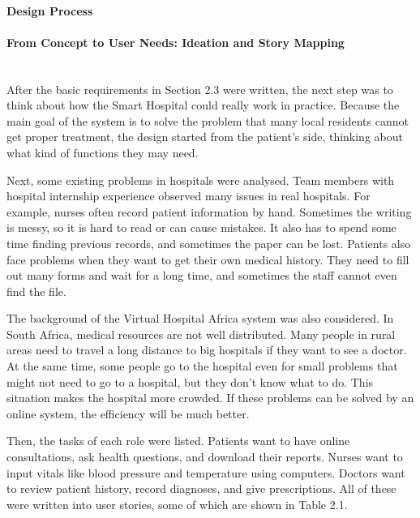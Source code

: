 %
%

\paragraph{Design Process}\mbox{}
\paragraph{From Concept to User Needs: Ideation and Story Mapping}\mbox{}\\
After the basic requirements in Section 2.3 were written, the next step was to think about how the Smart Hospital could really work in practice. Because the main goal of the system is to solve the problem that many local residents cannot get proper treatment, the design started from the patient’s side, thinking about what kind of functions they may need.  

Next, some existing problems in hospitals were analysed. Team members with hospital internship experience observed many issues in real hospitals. For example, nurses often record patient information by hand. Sometimes the writing is messy, so it is hard to read or can cause mistakes. It also has to spend some time finding previous records, and sometimes the paper can be lost. Patients also face problems when they want to get their own medical history. They need to fill out many forms and wait for a long time, and sometimes the staff cannot even find the file.  

The background of the Virtual Hospital Africa system was also considered. In South Africa, medical resources are not well distributed. Many people in rural areas need to travel a long distance to big hospitals if they want to see a doctor. At the same time, some people go to the hospital even for small problems that might not need to go to a hospital, but they don’t know what to do. This situation makes the hospital more crowded. If these problems can be solved by an online system, the efficiency will be much better.  

Then, the tasks of each role were listed. Patients want to have online consultations, ask health questions, and download their reports. Nurses want to input vitals like blood pressure and temperature using computers. Doctors want to review patient history, record diagnoses, and give prescriptions. All of these were written into user stories, some of which are shown in Table 2.1.


